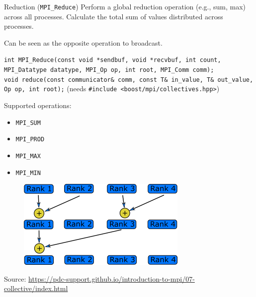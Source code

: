 \documentclass{beamer}
\begin{document}
\begin{frame}{Reduction (\texttt{MPI\_Reduce})}
  Perform a global reduction operation (e.g., sum, max) across all processes. Calculate the total sum of values distributed across processes.

  Can be seen as the opposite operation to broadcast.

  {
    \footnotesize
    \texttt{int MPI\_Reduce(const void *sendbuf, void *recvbuf, int count, MPI\_Datatype datatype, MPI\_Op op, int root, MPI\_Comm comm);} \\
    \texttt{void reduce(const communicator\& comm, const T\& in\_value, T\& out\_value, Op op, int root);} (needs \texttt{\#include <boost/mpi/collectives.hpp>})
  }

  \begin{minipage}[t]{0.2\textwidth}
    Supported operations:
    \begin{itemize}
      \item \texttt{MPI\_SUM}
      \item \texttt{MPI\_PROD}
      \item \texttt{MPI\_MAX}
      \item \texttt{MPI\_MIN}
    \end{itemize}
  \end{minipage}
  \hfill
  \begin{minipage}[t]{0.75\textwidth}
    \begin{figure}[h]
      \includegraphics[]{images/reduction.png}
    \end{figure}
  \end{minipage}
  {\footnotesize Source: \href{https://pdc-support.github.io/introduction-to-mpi/07-collective/index.html}{https://pdc-support.github.io/introduction-to-mpi/07-collective/index.html}}
\end{frame}
\end{document}
